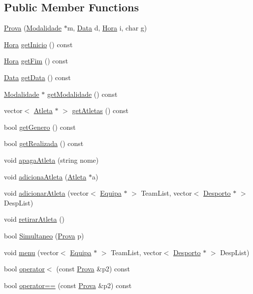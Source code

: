 \subsection*{Public Member Functions}
\begin{DoxyCompactItemize}
\item 
\hyperlink{class_prova_a5d67d4424ea4ed03475ddcf80dee3539}{Prova} (\hyperlink{class_modalidade}{Modalidade} $\ast$m, \hyperlink{class_data}{Data} d, \hyperlink{class_hora}{Hora} i, char g)
\item 
\hyperlink{class_hora}{Hora} \hyperlink{class_prova_a27a6579ac4f103e53cbdd65d1f7994d1}{get\+Inicio} () const 
\item 
\hyperlink{class_hora}{Hora} \hyperlink{class_prova_aef874ac6cf95b34bd3b1574158cddc5f}{get\+Fim} () const 
\item 
\hyperlink{class_data}{Data} \hyperlink{class_prova_a2dbc83f56f67433d62246d9f69629b11}{get\+Data} () const 
\item 
\hyperlink{class_modalidade}{Modalidade} $\ast$ \hyperlink{class_prova_afbf918fbf8ddfd7a2b3785af51536e25}{get\+Modalidade} () const 
\item 
vector$<$ \hyperlink{class_atleta}{Atleta} $\ast$ $>$ \hyperlink{class_prova_a293abf27bb26c97f150be37c3a3e3636}{get\+Atletas} () const 
\item 
bool \hyperlink{class_prova_a5ebde6f5552c4459c0b5b7c677085a9e}{get\+Genero} () const 
\item 
bool \hyperlink{class_prova_abec8bb56f6e6e903b38aad4cc3f50e67}{get\+Realizada} () const 
\item 
void \hyperlink{class_prova_a6ef32c4d0f63b9576db83e4a8d63f390}{apaga\+Atleta} (string nome)
\item 
void \hyperlink{class_prova_abdb9448d1bc2efcb5b94265ddc73f4da}{adiciona\+Atleta} (\hyperlink{class_atleta}{Atleta} $\ast$a)
\item 
void \hyperlink{class_prova_a7c3eaa4b48561e50476739984f4c5648}{adicionar\+Atleta} (vector$<$ \hyperlink{class_equipa}{Equipa} $\ast$ $>$ Team\+List, vector$<$ \hyperlink{class_desporto}{Desporto} $\ast$ $>$ Desp\+List)
\item 
void \hyperlink{class_prova_aaee7c0aec1a890ab7e09e02f11f11d87}{retirar\+Atleta} ()
\item 
bool \hyperlink{class_prova_a0d9a660b9543ba8c8f9fb4509ff507d6}{Simultaneo} (\hyperlink{class_prova}{Prova} p)
\item 
void \hyperlink{class_prova_af8c2055a8a7e5edf94cacb5ef0d89e91}{menu} (vector$<$ \hyperlink{class_equipa}{Equipa} $\ast$ $>$ Team\+List, vector$<$ \hyperlink{class_desporto}{Desporto} $\ast$ $>$ Desp\+List)
\item 
bool \hyperlink{class_prova_a0da7d3508f91a710a250761498f7e9ba}{operator$<$} (const \hyperlink{class_prova}{Prova} \&p2) const 
\item 
bool \hyperlink{class_prova_a203f2d4d871609222a0621ae631bb1f5}{operator==} (const \hyperlink{class_prova}{Prova} \&p2) const 
\end{DoxyCompactItemize}
